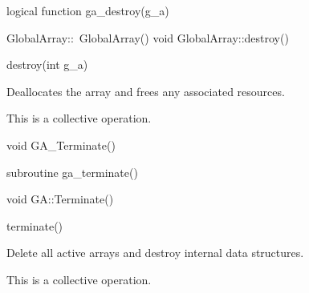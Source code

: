 \documentclass[12pt]{article}
\begin{document}
\begin{fapi}
\begin{fcode}
logical function ga_destroy(g_a)  
\end{fcode}
\begin{funcargs}
\end{funcargs}
\end{fapi}

\begin{cxxapi}
\begin{cxxcode}
GlobalArray::~GlobalArray()
void GlobalArray::destroy()
\end{cxxcode}
\end{cxxapi}

\begin{pyapi}
\begin{pycode}
destroy(int g_a)
\end{pycode}
\end{pyapi}
\gcoll

\begin{desc}

Deallocates the array and frees any associated resources.

This is a collective operation.

\end{desc}


\begin{capi}
\begin{ccode}
void GA_Terminate()
\end{ccode}
\end{capi}

\begin{fapi}
\begin{fcode}
subroutine ga_terminate()
\end{fcode}
\end{fapi}

\begin{cxxapi}
\begin{cxxcode}
void GA::Terminate()
\end{cxxcode}
\end{cxxapi}

\begin{pyapi}
\begin{pycode}
terminate()
\end{pycode}
\end{pyapi}
\wcoll

\begin{desc}

Delete all active arrays and destroy internal data structures.

This is a collective operation.

\end{desc}
\end{document}
